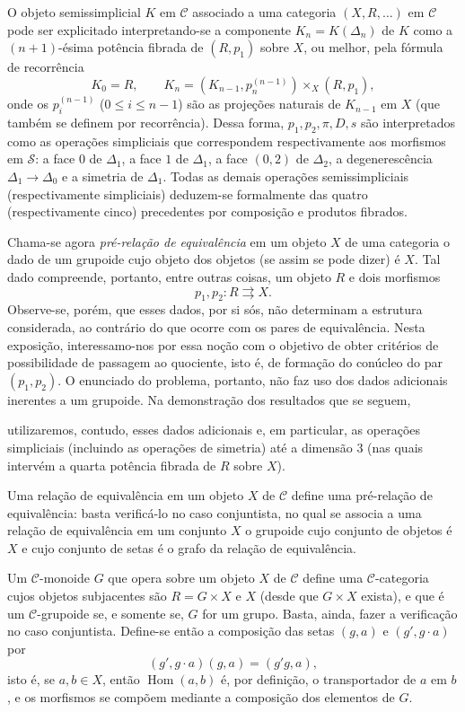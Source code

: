\documentclass[11pt,twoside,openany]{book}
\numberwithin{equation}{section}
\newcommand{\src}[1]{%
  \phantomsection\hypertarget{src:#1}{}%
  \marginpar{\raggedleft\footnotesize\sffamily #1}%
}
\theoremstyle{plain}
\theoremstyle{definition}
\theoremstyle{remark}
\newcommand{\FgaUnitKey}{frontmatter}
\renewcommand{\src}[1]{%
  \phantomsection\hypertarget{src:\FgaUnitKey:#1}{}%
  \marginpar{\raggedleft\footnotesize\sffamily #1}%
}
\begin{document}
O objeto semissimplicial $K$ em $\mathcal C$ associado a uma categoria
$(X,R,\ldots)$ em $\mathcal C$ pode ser explicitado interpretando-se a
componente $K_n=K(\Delta_n)$ de $K$ como a $(n+1)$-ésima potência fibrada de
$(R,p_1)$ sobre $X$, ou melhor, pela fórmula de recorrência
\[
  K_0=R,\qquad
  K_n=(K_{n-1},p_n^{(n-1)})\times_X(R,p_1),
\]
onde os $p_i^{(n-1)}$ ($0\leq i\leq n-1$) são as projeções naturais de
$K_{n-1}$ em $X$ (que também se definem por recorrência). Dessa forma,
$p_1,p_2,\pi,D,s$ são interpretados como as operações simpliciais que
correspondem respectivamente aos morfismos em $\mathcal S$: a face $0$ de
$\Delta_1$, a face $1$ de $\Delta_1$, a face $(0,2)$ de $\Delta_2$, a
degenerescência $\Delta_1\to\Delta_0$ e a simetria de $\Delta_1$. Todas as
demais operações semissimpliciais (respectivamente simpliciais) deduzem-se
formalmente das quatro (respectivamente cinco) precedentes por composição e
produtos fibrados.

Chama-se agora \emph{pré-relação de equivalência} em um objeto $X$ de uma
categoria o dado de um grupoide cujo objeto dos objetos (se assim se pode
dizer) é $X$. Tal dado compreende, portanto, entre outras coisas, um objeto $R$
e dois morfismos
\[
  p_1,p_2:R\rightrightarrows X.
\]
Observe-se, porém, que esses dados, por si sós, não determinam a estrutura
considerada, ao contrário do que ocorre com os pares de equivalência. Nesta
exposição, interessamo-nos por essa noção com o objetivo de obter critérios de
possibilidade de passagem ao quociente, isto é, de formação do conúcleo do par
$(p_1,p_2)$. O enunciado do problema, portanto, não faz uso dos dados
adicionais inerentes a um grupoide. Na demonstração dos resultados que se
seguem,
\src{110}
utilizaremos, contudo, esses dados adicionais e, em particular, as operações
simpliciais (incluindo as operações de simetria) até a dimensão $3$ (nas quais
intervém a quarta potência fibrada de $R$ sobre $X$).

Uma relação de equivalência em um objeto $X$ de $\mathcal C$ define uma
pré-relação de equivalência: basta verificá-lo no caso conjuntista, no qual se
associa a uma relação de equivalência em um conjunto $X$ o grupoide cujo
conjunto de objetos é $X$ e cujo conjunto de setas é o grafo da relação de
equivalência.

Um $\mathcal C$-monoide $G$ que opera sobre um objeto $X$ de $\mathcal C$
define uma $\mathcal C$-categoria cujos objetos subjacentes são $R=G\times X$
e $X$ (desde que $G\times X$ exista), e que é um $\mathcal C$-grupoide se, e
somente se, $G$ for um grupo. Basta, ainda, fazer a verificação no caso
conjuntista. Define-se então a composição das setas $(g,a)$ e
$(g',g\cdot a)$ por
\[
  (g',g\cdot a)(g,a)=(g'g,a),
\]
isto é, se $a,b\in X$, então $\operatorname{Hom}(a,b)$ é, por definição, o
transportador de $a$ em $b$, e os morfismos se compõem mediante a composição
dos elementos de $G$.
\end{document}
